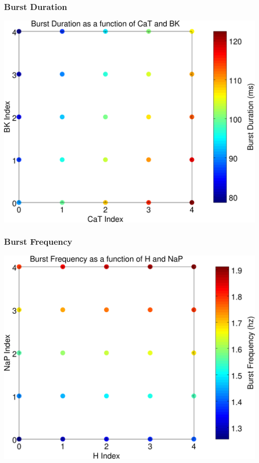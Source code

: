\documentclass{beamer}
\theoremstyle{plain}
\theoremstyle{definition}
\begin{document}
\begin{frame}\frametitle{Burst Duration}
  \begin{center}
    \includegraphics[scale=.5]{BurstDurationScatter.pdf}%
  \end{center}
\end{frame}

\begin{frame}\frametitle{Burst Frequency}
  \begin{center}
    \includegraphics[scale=.5]{BurstFrequencyScatter.pdf}%
  \end{center}
\end{frame}
\end{document}
